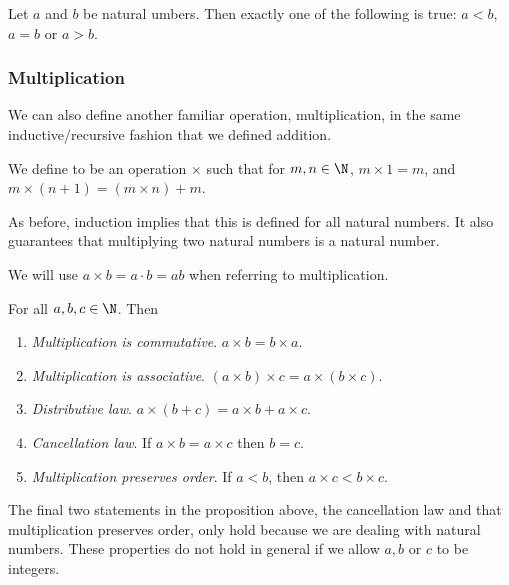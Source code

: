 \begin{proposition}[Trichotomy]
	Let $a$ and $b$ be natural umbers. Then exactly one of the following is true: $a < b$, $a = b$ or $a > b$.
\end{proposition}

\subsubsection{Multiplication}

We can also define another familiar operation, multiplication, in the same inductive/recursive fashion that we defined addition.

\begin{definition}[Multiplication]
	We define  to be an operation $\times$ such that for $m, n \in \N$, $m \times 1 = m$, and $m \times (n + 1) = (m \times n) + m$.
\end{definition}
As before, induction implies that this is defined for all natural numbers. It also guarantees that multiplying two natural numbers is a natural number.

\begin{notation}
We will use $a \times b = a\cdot b = ab$ when referring to multiplication.
\end{notation}

\begin{proposition}
	For all $a, b, c \in \N$. Then
	\begin{enumerate}[label=(\roman*)]
		\item \emph{Multiplication is commutative}. $a \times b = b \times a$.
		\item \emph{Multiplication is associative}. $(a \times b) \times c = a \times (b \times c)$.
		\item \emph{Distributive law}. $a \times(b + c) = a \times b + a \times c$. 
		\item \emph{Cancellation law}. If $a\times b = a\times c$ then $b = c$.
		\item \emph{Multiplication preserves order}. If $a < b$, then $a\times c < b \times c$.
	\end{enumerate}
\end{proposition}
\begin{remark}
	The final two statements in the proposition above, the cancellation law and that multiplication preserves order, only hold because we are dealing with natural numbers. These properties do not hold in general if we allow $a, b$ or $c$ to be integers.
\end{remark}

